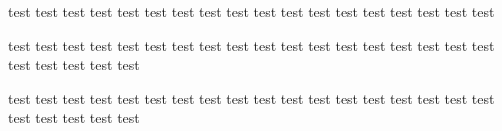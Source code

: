 ﻿\documentclass{ctexart}
\begin{document}
    test test test test test test test test test test test test test test test test\hspace*{5em} test test

    {\setlength{\fboxsep}{0pt}
    \fbox{\parbox{2em}{\rule{2pt}{2em}}}
    }
    
    test test test test test test test test test test test test test test test test test test test test test test test 

    \vspace{2em}test test test test test test test test test test test test test test test test test test test test test test test
    
\end{document}
